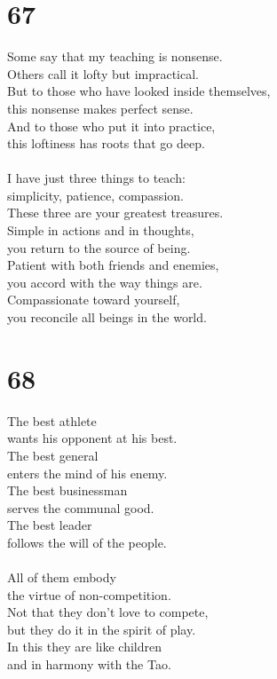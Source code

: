 \documentclass[b5paper, 12pt, oneside]{book}
\begin{document}
\chapter*{67}
Some say that my teaching is nonsense.\\
Others call it lofty but impractical.\\
But to those who have looked inside themselves,\\
this nonsense makes perfect sense.\\
And to those who put it into practice,\\
this loftiness has roots that go deep.\\
\\
I have just three things to teach:\\
simplicity, patience, compassion.\\
These three are your greatest treasures.\\
Simple in actions and in thoughts,\\
you return to the source of being.\\
Patient with both friends and enemies,\\
you accord with the way things are.\\
Compassionate toward yourself,\\
you reconcile all beings in the world.

\chapter*{68}
The best athlete\\
wants his opponent at his best.\\
The best general\\
enters the mind of his enemy.\\
The best businessman\\
serves the communal good.\\
The best leader\\
follows the will of the people.\\
\\
All of them embody\\
the virtue of non-competition.\\
Not that they don't love to compete,\\
but they do it in the spirit of play.\\
In this they are like children\\
and in harmony with the Tao.
\end{document}
